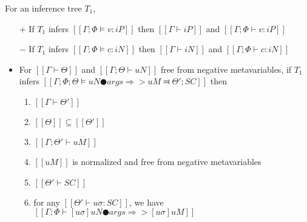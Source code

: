 \begin{lemma} \label{lemma:typing-soundness}
    For an inference tree $T_1$,
    \hfill
    \begin{itemize}
        \item [$+$] If $T_1$ infers $[[Γ; Φ ⊨ v : iP]]$ then $[[Γ ⊢ iP]]$ and $[[Γ; Φ ⊢ v : iP]]$
        \item [$-$] If $T_1$ infers $[[Γ; Φ ⊨ c : iN]]$ then $[[Γ ⊢ iN]]$ and $[[Γ; Φ ⊢ c : iN]]$
        \item  For $[[Γ ⊢ Θ]]$ and $[[Γ; Θ ⊢ uN]]$ free from negative metavariables,
        if $T_1$ infers $[[Γ; Φ; Θ ⊨ uN ● args ⇒> uM ⫤ Θ'; SC]]$ then
        \begin{enumerate}
            \item $[[Γ ⊢ Θ']]$
            \item $[[Θ]] \subseteq [[Θ']]$
            \item $[[Γ; Θ' ⊢ uM]]$
            \item $[[uM]]$ is normalized and free from negative metavariables
            \item $[[Θ' ⊢ SC]]$
            \item for any $[[Θ' ⊢ uσ : SC]]$, we have $[[ Γ ; Φ ⊢ [uσ]uN ● args ⇒> [uσ]uM ]]$
        \end{enumerate}
    \end{itemize}
\end{lemma}
